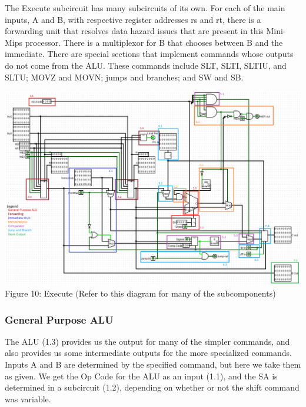 \documentclass{article}
\begin{document}
The Execute subcircuit has many subcircuits of its own. For each of the main inputs, A and B, with respective register addresses rs and rt, there is a forwarding unit that resolves data hazard issues that are present in this Mini-Mips processor. There is a multiplexor for B that chooses between B and the immediate. There are special sections that implement commands whose outputs do not come from the ALU. These commands include SLT, SLTI, SLTIU, and SLTU; MOVZ and MOVN; jumps and branches; and SW and SB. 
\vspace{5mm}
\begin{center}
\includegraphics[width=15cm]{EXOVER.png} \\
Figure 10: Execute (Refer to this diagram for many of the subcomponents)
\end{center}

\subsubsection{General Purpose ALU}
The ALU (1.3) provides us the output for many of the simpler commands, and also provides us some intermediate outputs for the more specialized commands. Inputs A and B are determined by the specified command, but here we take them as given. We get the Op Code for the ALU as an input (1.1), and the SA is determined in a subcircuit (1.2), depending on whether or not the shift command was variable. 
\end{document}
